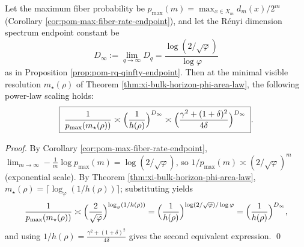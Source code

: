 \begin{corollary}\label{cor:xi-bulk-horizon-defect-visibility-Dinfty}
Let the maximum fiber probability be \(p_{\max}(m)=\max_{x\in X_m}d_m(x)/2^m\) (Corollary \ref{cor:pom-max-fiber-rate-endpoint}), and let the R\'enyi dimension spectrum endpoint constant be
\[
D_\infty:=\lim_{q\to\infty}D_q=\frac{\log(2/\sqrt{\varphi})}{\log\varphi}
\]
as in Proposition \ref{prop:pom-rq-qinfty-endpoint}.
Then at the minimal visible resolution \(m_\star(\rho)\) of Theorem \ref{thm:xi-bulk-horizon-phi-area-law}, the following power-law scaling holds:
\[
\boxed{\;
\frac{1}{p_{\max}(m_\star(\rho))}
\asymp
\Bigl(\frac{1}{h(\rho)}\Bigr)^{D_\infty}
\asymp
\Bigl(\frac{\gamma^2+(1+\delta)^2}{4\delta}\Bigr)^{D_\infty}\; }.
\]
\end{corollary}
\begin{proof}
By Corollary \ref{cor:pom-max-fiber-rate-endpoint},
\(
\lim_{m\to\infty}-\frac{1}{m}\log p_{\max}(m)=\log(2/\sqrt{\varphi})
\),
so \(1/p_{\max}(m)\asymp (2/\sqrt{\varphi})^{m}\) (exponential scale).
By Theorem \ref{thm:xi-bulk-horizon-phi-area-law}, \(m_\star(\rho)=\lceil \log_\varphi(1/h(\rho))\rceil\); substituting yields
\[
\frac{1}{p_{\max}(m_\star(\rho))}
\asymp
\Bigl(\frac{2}{\sqrt{\varphi}}\Bigr)^{\log_{\varphi}(1/h(\rho))}
=\Bigl(\frac{1}{h(\rho)}\Bigr)^{\log(2/\sqrt{\varphi})/\log\varphi}
=\Bigl(\frac{1}{h(\rho)}\Bigr)^{D_\infty},
\]
and using \(1/h(\rho)=\frac{\gamma^2+(1+\delta)^2}{4\delta}\) gives the second equivalent expression. \qed
\end{proof}

